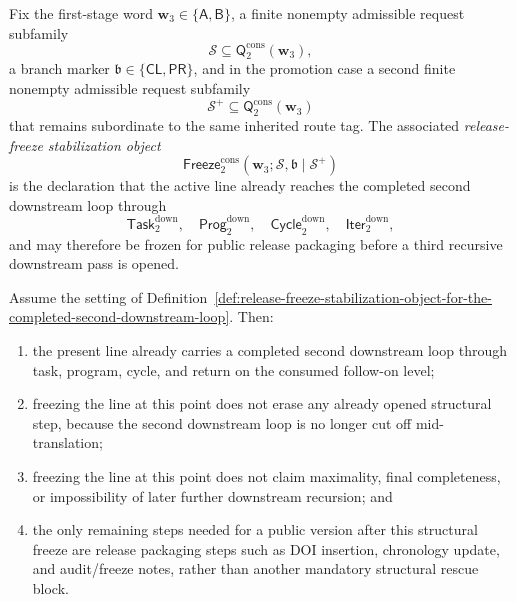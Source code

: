 \begin{definition}
\label{def:release-freeze-stabilization-object-for-the-completed-second-downstream-loop}
Fix the first-stage word \(\mathbf w_3\in\{\mathsf A,\mathsf B\}\), a finite nonempty admissible request subfamily
\[
 \mathcal S\subseteq \mathsf{Q}^{\mathrm{cons}}_{2}(\mathbf w_3),
\]
a branch marker \(\mathfrak b\in\{\mathsf{CL},\mathsf{PR}\}\), and in the promotion case a second finite nonempty admissible request subfamily
\[
 \mathcal S^{+}\subseteq \mathsf{Q}^{\mathrm{cons}}_{2}(\mathbf w_3)
\]
that remains subordinate to the same inherited route tag. The associated \emph{release-freeze stabilization object}
\[
 \mathsf{Freeze}^{\mathrm{cons}}_{2}(\mathbf w_3;\mathcal S,\mathfrak b\mid\mathcal S^{+})
\]
is the declaration that the active line already reaches the completed second downstream loop through
\[
 \mathsf{Task}^{\mathrm{down}}_{2},
 \quad
 \mathsf{Prog}^{\mathrm{down}}_{2},
 \quad
 \mathsf{Cycle}^{\mathrm{down}}_{2},
 \quad
 \mathsf{Iter}^{\mathrm{down}}_{2},
\]
and may therefore be frozen for public release packaging before a third recursive downstream pass is opened.
\end{definition}

\begin{proposition}
\label{prop:the-completed-second-downstream-loop-already-supplies-an-honest-public-freeze-point}
Assume the setting of Definition~\ref{def:release-freeze-stabilization-object-for-the-completed-second-downstream-loop}. Then:
\begin{enumerate}[label=(\roman*)]
 \item the present line already carries a completed second downstream loop through task, program, cycle, and return on the consumed follow-on level;
 \item freezing the line at this point does not erase any already opened structural step, because the second downstream loop is no longer cut off mid-translation;
 \item freezing the line at this point does not claim maximality, final completeness, or impossibility of later further downstream recursion; and
 \item the only remaining steps needed for a public version after this structural freeze are release packaging steps such as DOI insertion, chronology update, and audit/freeze notes, rather than another mandatory structural rescue block.
\end{enumerate}
\end{proposition}

